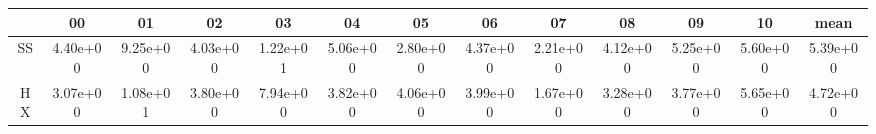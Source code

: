 \centering
\begin{tabular}{|c|c|c|c|c|c|c|c|c|c|c|c|c|}
\hline
 & 00 & 01 & 02 & 03 & 04 & 05 & 06 & 07 & 08 & 09 & 10 & mean \\
\hline
SS & 4.40e+00 & 9.25e+00 & 4.03e+00 & 1.22e+01 & 5.06e+00 & 2.80e+00 & 4.37e+00 & 2.21e+00 & 4.12e+00 & 5.25e+00 & 5.60e+00 & 5.39e+00 \\
\hline
HX & 3.07e+00 & 1.08e+01 & 3.80e+00 & 7.94e+00 & 3.82e+00 & 4.06e+00 & 3.99e+00 & 1.67e+00 & 3.28e+00 & 3.77e+00 & 5.65e+00 & 4.72e+00 \\
\hline
\end{tabular}

